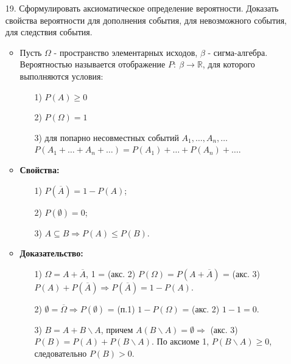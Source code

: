 \documentclass[a4paper]{article}
\begin{document}
\begin{enumerate}
\item[19.] Сформулировать аксиоматическое определение вероятности. Доказать свойства вероятности для дополнения события, для невозможного события, для следствия события. \\
\begin{itemize}
\item Пусть $\Omega$ - пространство элементарных исходов, $\beta$ - сигма-алгебра. Вероятностью называется отображение $P: \ \beta \to \mathbb{R}$, для которого выполняются условия:
	\begin{enumerate}
	\item[1)] $P(A) \geqslant 0$
	\item[2)] $P(\Omega) = 1$ 
	\item[3)] для попарно несовместных событий $A_1, \ldots, A_n, \ldots$  $P(A_1 + \ldots + A_n + \ldots) = P(A_1) + \ldots + P(A_n) + \ldots$.
	\end{enumerate}
\item \textbf{Свойства:}
	\begin{enumerate}
	\item[1)] $P(\overline{A}) = 1 - P(A)$;
	\item[2)] $P(\emptyset) = 0$;
	\item[3)] $A \subseteq B \Rightarrow P(A) \leqslant P(B)$.
	\end{enumerate}
\item \textbf{Доказательство:}
	\begin{enumerate}
	\item[1)] $\Omega = A + \overline{A}$, 1 = (акс. 2) $P(\Omega) = P(A + \overline{A})$ = (акс. 3)$P(A) + P(\overline{A}) \Rightarrow P(\overline{A}) = 1 - P(A)$.
	\item[2)] $\emptyset = \overline{\Omega} \Rightarrow P(\emptyset)$ = (п.1) $1 - P(\Omega)$ = (акс. 2) $1 - 1 = 0$.
	\item[3)] $B = A + B \backslash A$, причем $A(B \backslash A) = \emptyset \Rightarrow$ (акс. 3) $P(B) = P(A) + P(B \backslash A)$. По аксиоме 1, $P(B \backslash A) \geqslant 0$, следовательно $P(B) > 0$.
	\end{enumerate}
\end{itemize}




\end{enumerate}
\end{document}
